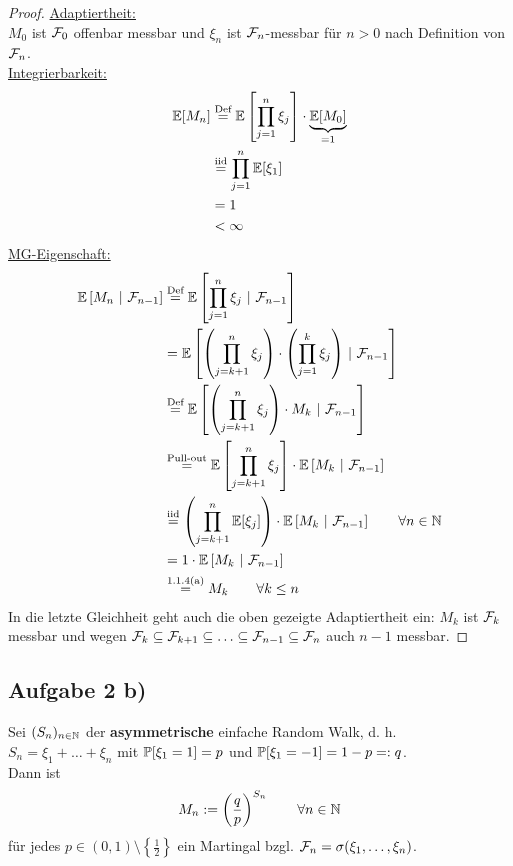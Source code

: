 \documentclass[12pt,a4paper]{article}
\begin{document}
\begin{proof}
	\underline{Adaptiertheit:}\\
	$M_0$ ist $\F_0$ offenbar messbar und
	$\xi_n$ ist $\F_n$-messbar für $n>0$ nach Definition von $\F_n$.	\\
	
	 \underline{Integrierbarkeit:}
	\begin{align*}
		\E[M_n]
		&\stackeq{\text{Def}}\E\left[\prod_{j=1}^n \xi_j\right]\cdot\underbrace{\E[M_0]}_{=1} \\
		&\stackeq{\text{iid}}\prod_{j=1}^n \E[\xi_1] \\
		&= 1 \\
		&<\infty
	\end{align*}
	\underline{MG-Eigenschaft:}
	\begin{align*}
		\BedE{M_n}{\F_{n-1}}
		&\stackeq{\text{Def}} \BedE{\prod_{j=1}^n \xi_j}{\F_{n-1}} \\
		&\stackeq{} \BedE{\left(\prod_{j=k+1}^n \xi_j\right)\cdot\left(\prod_{j=1}^k \xi_j\right)}{\F_{n-1}} \\
		&\stackeq{\text{Def}} \BedE{\left(\prod_{j=k+1}^n \xi_j\right)\cdot M_k}{\F_{n-1}} \\
		&\stackeq{\text{Pull-out}} \E\left[\prod_{j=k+1}^n \xi_j\right]\cdot\BedE{M_{k}}{\F_{n-1}} \\
		&\stackeq{\text{iid}} \left(\prod_{j=k+1}^n\E[\xi_j]\right) \cdot \BedE{M_{k}}{\F_{n-1}}\qquad\forall n\in\N\\
		&= 1\cdot \BedE{M_{k}}{\F_{n-1}}\\
		&\stackeq{\text{1.1.4(a)}} M_{k}\qquad\forall k\leq n
	\end{align*}
In die letzte Gleichheit geht auch die oben gezeigte Adaptiertheit ein: $M_k$ ist $\F_k$ messbar und wegen $\F_{k}\subseteq \F_{k+1}\subseteq\ldots\subseteq \F_{n-1}\subseteq\F_n$ auch $n-1$ messbar.
\end{proof}

\subsection*{Aufgabe 2 b)}
Sei $(S_n)_{n\in\N}$ der \textbf{asymmetrische} einfache Random Walk, d. h.\\ $S_n=\xi_1+\ldots+\xi_n$ mit $\P[\xi_1=1]=p$ und $\P[\xi_1=-1]=1-p=:q$.\\
Dann ist 
\begin{align*}
M_n:=\left(\frac{q}{p}\right)^{S_n}\qquad\forall n\in\N
\end{align*}
für jedes $p\in (0,1)\setminus\left\lbrace\frac{1}{2}\right\rbrace$ ein Martingal bzgl. $\F_n=\sigma(\xi_1,\ldots,\xi_n)$.
\end{document}

